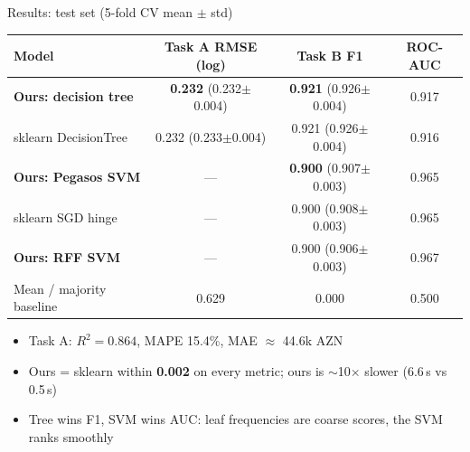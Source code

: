 \documentclass[aspectratio=169,11pt]{beamer}
\begin{document}
\begin{frame}{Results: test set (5-fold CV mean $\pm$ std)}
  \begin{center}\small
  \begin{tabular}{lccc}
    \toprule
    \textbf{Model} & \textbf{Task A RMSE (log)} & \textbf{Task B F1} & \textbf{ROC-AUC} \\
    \midrule
    \textbf{Ours: decision tree} & \textbf{0.232} (0.232$\pm$0.004) & \textbf{0.921} (0.926$\pm$0.004) & 0.917 \\
    sklearn DecisionTree         & 0.232 (0.233$\pm$0.004) & 0.921 (0.926$\pm$0.004) & 0.916 \\
    \midrule
    \textbf{Ours: Pegasos SVM}   & --- & \textbf{0.900} (0.907$\pm$0.003) & 0.965 \\
    sklearn SGD hinge            & --- & 0.900 (0.908$\pm$0.003) & 0.965 \\
    \textbf{Ours: RFF SVM}       & --- & 0.900 (0.906$\pm$0.003) & 0.967 \\
    \midrule
    Mean / majority baseline     & 0.629 & 0.000 & 0.500 \\
    \bottomrule
  \end{tabular}
  \end{center}

  \vspace{0.3em}
  \begin{itemize}\setlength\itemsep{0.2em}
    \item Task A: $R^2=0.864$, MAPE 15.4\%, MAE $\approx$ 44.6k AZN
    \item Ours = sklearn within \textbf{0.002} on every metric; ours is $\sim$10$\times$ slower (6.6\,s vs 0.5\,s)
    \item Tree wins F1, SVM wins AUC: leaf frequencies are coarse scores, the SVM ranks smoothly
  \end{itemize}
\end{frame}
\end{document}
